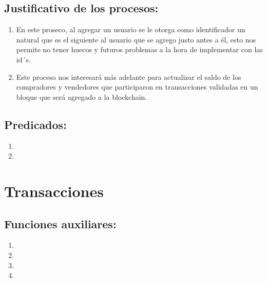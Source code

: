 \documentclass[10pt,a4paper]{article}
\begin{document}
\subsection{Justificativo de los procesos: }

\begin{enumerate}
    \item En este proseco, al agregar un usuario se le otorga como identificador un natural que es el siguiente al usuario que se agrego justo antes a él, esto nos permite no tener huecos y futuros problemas a la hora de implementar con las id´s.

    \item Este proceso nos interesará más adelante para actualizar el saldo de los compradores y vendedores que participaron en transacciones validadas en un bloque que será agregado a la blockchain.
\end{enumerate}

\subsection{Predicados: }

\begin{enumerate}
    \item {}
    \item {}
\end{enumerate}


\section{Transacciones}
\label{4}
\subsection{Funciones auxiliares: }

\begin{enumerate}
    \item {}
    \item {}
    \item {}
    \item {}
\end{enumerate}
\end{document}
